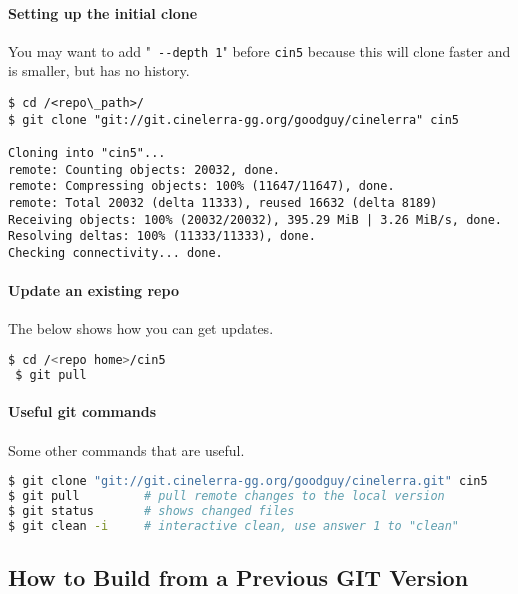 \paragraph{Setting up the initial clone}%
\label{par:setting_up_the_initial_clone}

You may want to add "\texttt{ -{}-depth 1}" before \texttt{cin5} because this will clone faster and is smaller, but has no history.

\begin{lstlisting}[numbers=none]
$ cd /<repo\_path>/
$ git clone "git://git.cinelerra-gg.org/goodguy/cinelerra" cin5

Cloning into "cin5"...
remote: Counting objects: 20032, done.
remote: Compressing objects: 100% (11647/11647), done.
remote: Total 20032 (delta 11333), reused 16632 (delta 8189)
Receiving objects: 100% (20032/20032), 395.29 MiB | 3.26 MiB/s, done.
Resolving deltas: 100% (11333/11333), done.
Checking connectivity... done.
\end{lstlisting}

\paragraph{Update an existing repo}%
\label{par:update_an_existing_repo}
The below shows how you can get updates.

\begin{lstlisting}[language=bash,numbers=none]
 $ cd /<repo home>/cin5
 $ git pull
\end{lstlisting}

\paragraph{Useful git commands}%
\label{par:useful_git_commands}
Some other commands that are useful.

\begin{lstlisting}[language=bash,numbers=none]
$ git clone "git://git.cinelerra-gg.org/goodguy/cinelerra.git" cin5
$ git pull         # pull remote changes to the local version
$ git status       # shows changed files
$ git clean -i     # interactive clean, use answer 1 to "clean"
\end{lstlisting}



\subsection{How to Build from a Previous GIT Version}%
\label{sub:how_to_build_from_a_previous_git_version}


